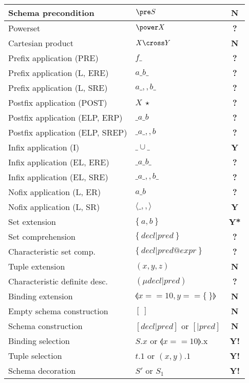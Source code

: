 \documentclass{article}
\begin{document}
\begin{table}[h]
\begin{tabular}{|l|l|c|}
\hline
Schema precondition & $\pre S$ & \textbf{N} \\
\hline
Powerset & $\power X$ & \textbf{?} \\
\hline
Cartesian product & $X \cross Y$ & \textbf{N} \\
\hline
Prefix application (PRE) & $f \_$ & \textbf{?} \\
\hline
Prefix application (L, ERE) & $a \_ b \_$ & \textbf{?} \\
\hline
Prefix application (L, SRE) & $a \_ ,, b \_$ & \textbf{?} \\
\hline
Postfix application (POST) & $X~\star$ & \textbf{?} \\
\hline
Postfix application (ELP, ERP) & $\_ a \_ b$ & \textbf{?} \\
\hline
Postfix application (ELP, SREP) & $\_ a \_,, b$ & \textbf{?} \\
\hline
Infix application (I) & $\_ \cup \_$ & \textbf{Y} \\
\hline
Infix application (EL, ERE) & $\_ a \_ b \_$ & \textbf{?} \\
\hline
Infix application (EL, SRE) & $\_ a \_ ,, b \_$ & \textbf{?} \\
\hline
Nofix application (L, ER) & $a \_ b$ & \textbf{?} \\
\hline
Nofix application (L, SR) & $\langle \_,,\rangle$ & \textbf{Y} \\
\hline
Set extension & $\{~a, b~\}$ & \textbf{Y*} \\
\hline
Set comprehension & $\{~ decl | pred ~\}$ & \textbf{?} \\
\hline
Characteristic set comp. & $\{~ decl | pred @ expr ~\}$ & \textbf{?} \\
\hline
Tuple extension & $(x, y, z)$ & \textbf{N} \\
\hline
Characteristic definite desc. & $(\mu decl | pred)$ & \textbf{?} \\
\hline
Binding extension & $\lblot x == 10, y == \{~\} \rblot$ & \textbf{N} \\
\hline
Empty schema construction & $[~]$ & \textbf{N} \\
\hline
Schema construction & $[ decl | pred ]$ or $[ | pred]$ & \textbf{N} \\
\hline
Binding selection & $S.x$ or $\lblot x == 10 \rblot$.x & \textbf{Y!} \\
\hline
Tuple selection & $t.1$ or $(x,y).1$ & \textbf{Y!} \\
\hline
Schema decoration & $S'$ or $S_1$ & \textbf{Y!} \\

\end{tabular}
\end{table}
\end{document}
